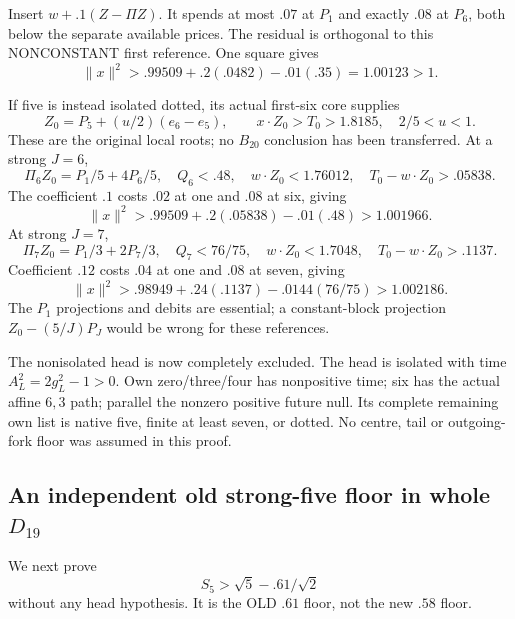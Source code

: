 \documentclass[11pt]{article}
\theoremstyle{definition}
\theoremstyle{remark}
\begin{document}
Insert \(w+.1(Z-\Pi Z)\).
It spends at most \(.07\) at
\(P_1\) and exactly \(.08\) at
\(P_6\), both below the separate
available prices.
The residual is orthogonal
to this NONCONSTANT first reference.
One square gives
\[
                         \|x\|^2>.99509+.2(.0482)-.01(.35)
                                           =1.00123>1 .
\]

If five is instead isolated dotted,
its actual first-six core supplies
\[
 Z_0=P_5+(u/2)(e_6-e_5),\qquad
                   x\cdot Z_0>T_0>1.8185,\quad2/5<u<1 .
\]
These are the original local
roots; no \(B_{20}\) conclusion
has been transferred.
At a strong \(J=6\),
\[
 \Pi_6Z_0=P_1/5+4P_6/5,\quad
 Q_6<.48,\quad w\cdot Z_0<1.76012,\quad
                            T_0-w\cdot Z_0>.05838 .
\]
The coefficient \(.1\) costs
\(.02\) at one and \(.08\) at
six, giving
\[
                         \|x\|^2>.99509+.2(.05838)-.01(.48)>1.001966 .
\]
At strong \(J=7\),
\[
 \Pi_7Z_0=P_1/3+2P_7/3,\quad Q_7<76/75,\quad
             w\cdot Z_0<1.7048,\quad T_0-w\cdot Z_0>.1137 .
\]
Coefficient \(.12\) costs \(.04\)
at one and \(.08\) at seven,
giving
\[
                    \|x\|^2>.98949+.24(.1137)-.0144(76/75)>1.002186 .
\]
The \(P_1\) projections and debits
are essential; a constant-block
projection \(Z_0-(5/J)P_J\) would
be wrong for these references.

The nonisolated head is now
completely excluded.
The head is isolated with time
\(A_L^2=2g_L^2-1>0\).
Own zero/three/four has nonpositive
time; six has the actual affine
\(6,3\) path; parallel the
nonzero positive future null.
Its complete remaining own list
is native five, finite at least
seven, or dotted.
No centre, tail or outgoing-fork
floor was assumed in this proof.

\subsection[An independent old strong-five floor in whole D19]{An independent old strong-five floor in whole \(D_{19}\)}
\label{app:exact19:Doldfive}

We next prove
\[
                              S_5>\sqrt5-.61/\sqrt2
\tag{D19old5}\label{app:exact19:eq:Doldfive}
\]
without any head hypothesis.
It is the OLD \(.61\) floor,
not the new \(.58\) floor.
\end{document}
